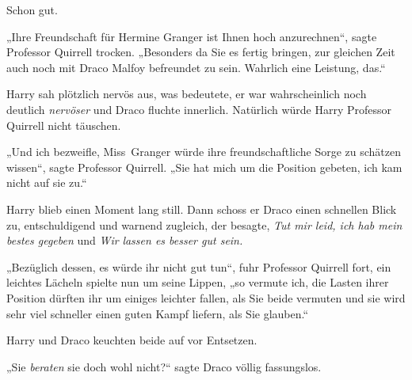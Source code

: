 Schon gut.

„Ihre Freundschaft für Hermine Granger ist Ihnen hoch anzurechnen“, sagte Professor Quirrell trocken. „Besonders da Sie es fertig bringen, zur gleichen Zeit auch noch mit Draco Malfoy befreundet zu sein. Wahrlich eine Leistung, das.“

Harry sah plötzlich nervös aus, was bedeutete, er war wahrscheinlich noch deutlich \emph{nervöser} und Draco fluchte innerlich. Natürlich würde Harry Professor Quirrell nicht täuschen.

„Und ich bezweifle, Miss~Granger würde ihre freundschaftliche Sorge zu schätzen wissen“, sagte Professor Quirrell. „Sie hat mich um die Position gebeten, ich kam nicht auf sie zu.“

Harry blieb einen Moment lang still. Dann schoss er Draco einen schnellen Blick zu, entschuldigend und warnend zugleich, der besagte, \emph{Tut mir leid, ich hab mein bestes gegeben} und \emph{Wir} \emph{lassen es besser gut sein.}

„Bezüglich dessen, es würde ihr nicht gut tun“, fuhr Professor Quirrell fort, ein leichtes Lächeln spielte nun um seine Lippen, „so vermute ich, die Lasten ihrer Position dürften ihr um einiges leichter fallen, als Sie beide vermuten und sie wird sehr viel schneller einen guten Kampf liefern, als Sie glauben.“

Harry und Draco keuchten beide auf vor Entsetzen.

„Sie \emph{beraten} sie doch wohl nicht?“ sagte Draco völlig fassungslos.

